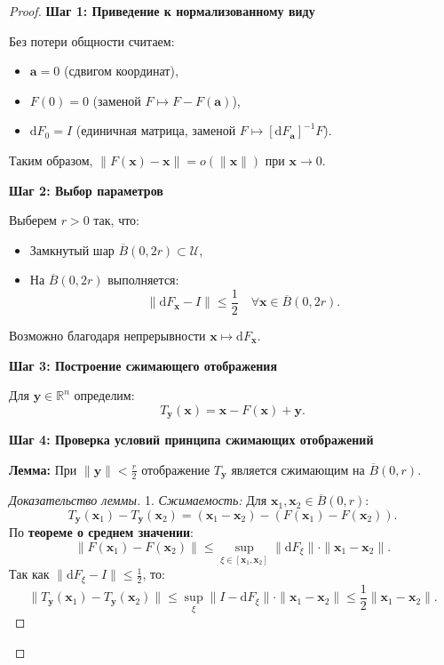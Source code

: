 \begin{proof}
\textbf{Шаг 1: Приведение к нормализованному виду}

Без потери общности считаем:
\begin{itemize}
    \item $\mathbf{a} = 0$ (сдвигом координат),
    \item $F(0) = 0$ (заменой $F \mapsto F - F(\mathbf{a})$),
    \item $\mathrm{d}F_{0} = I$ (единичная матрица, заменой $F \mapsto [\mathrm{d}F_{\mathbf{a}}]^{-1} F$).
\end{itemize}
Таким образом, $\|F(\mathbf{x}) - \mathbf{x}\| = o(\|\mathbf{x}\|)$ при $\mathbf{x} \to 0$.

\medskip
\textbf{Шаг 2: Выбор параметров}

Выберем $r > 0$ так, что:
\begin{itemize}
    \item Замкнутый шар $\overline{B}(0, 2r) \subset \mathscr{U}$,
    \item На $\overline{B}(0, 2r)$ выполняется:
    \[
    \|\mathrm{d}F_{\mathbf{x}} - I\| \leq \frac{1}{2} \quad \forall \mathbf{x} \in \overline{B}(0, 2r).
    \]
\end{itemize}
Возможно благодаря непрерывности $\mathbf{x} \mapsto \mathrm{d}F_{\mathbf{x}}$.

\medskip
\textbf{Шаг 3: Построение сжимающего отображения}

Для $\mathbf{y} \in \mathbb{R}^n$ определим:
\[
T_{\mathbf{y}}(\mathbf{x}) = \mathbf{x} - F(\mathbf{x}) + \mathbf{y}.
\]

\medskip
\textbf{Шаг 4: Проверка условий принципа сжимающих отображений}

\textbf{Лемма:} При $\|\mathbf{y}\| < \frac{r}{2}$ отображение $T_{\mathbf{y}}$ является сжимающим на $\overline{B}(0, r)$.

\begin{proof}[Доказательство леммы]
1. \textit{Сжимаемость:} Для $\mathbf{x}_1, \mathbf{x}_2 \in \overline{B}(0, r)$:
\[
T_{\mathbf{y}}(\mathbf{x}_1) - T_{\mathbf{y}}(\mathbf{x}_2) = (\mathbf{x}_1 - \mathbf{x}_2) - (F(\mathbf{x}_1) - F(\mathbf{x}_2)).
\]
По \textbf{теореме о среднем значении}:
\[
\|F(\mathbf{x}_1) - F(\mathbf{x}_2)\| \leq \sup_{\xi \in [\mathbf{x}_1,\mathbf{x}_2]} \|\mathrm{d}F_{\xi}\| \cdot \|\mathbf{x}_1 - \mathbf{x}_2\|.
\]
Так как $\|\mathrm{d}F_{\xi} - I\| \leq \frac{1}{2}$, то:
\[
\|T_{\mathbf{y}}(\mathbf{x}_1) - T_{\mathbf{y}}(\mathbf{x}_2)\| \leq \sup_{\xi} \|I - \mathrm{d}F_{\xi}\| \cdot \|\mathbf{x}_1 - \mathbf{x}_2\| \leq \frac{1}{2} \|\mathbf{x}_1 - \mathbf{x}_2\|.
\]


\end{proof}
\end{proof}
